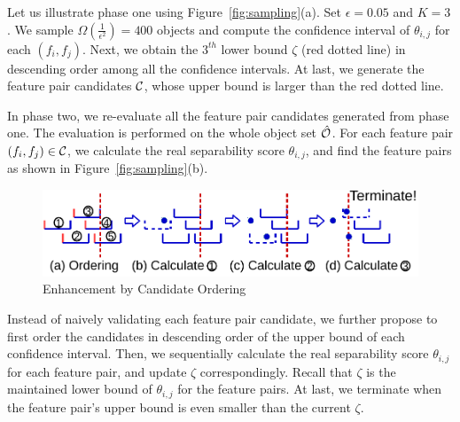 \begin{example}
Let us illustrate phase one using Figure~\ref{fig:sampling}(a). Set $\epsilon = 0.05$ and $K=3$. We sample $\Omega(\frac{1}{\epsilon^2})=400$ objects and compute the confidence interval of $\theta_{i,j}$ for each $(f_i,f_j)$. Next, we obtain the $3^{th}$ lower bound $\zeta$ (red dotted line) in descending order among all the confidence intervals. At last, we generate the feature pair candidates $\cc$, whose upper bound is larger than the red dotted line.
\end{example}

In phase two, we re-evaluate all the feature pair candidates generated from phase one. The evaluation is performed on the whole object set $\hat{\oo}$. For each feature pair $(f_i,f_j)\in \cc$, we calculate the real separability score $\theta_{i,j}$, and find the \topk feature pairs as shown in Figure~\ref{fig:sampling}(b). 
\begin{figure}[h]
  \centering
  \vspace{-5mm}
  \includegraphics[width=\linewidth]{fig/candidate_ordering.pdf}
  \vspace{-6mm}
\caption{Enhancement by Candidate Ordering}
\vspace{-5mm}
\label{fig:candidate_ordering}
\end{figure} 

  Instead of naively validating each feature pair candidate, we further propose to first order the candidates in descending order of the upper bound of each confidence interval. Then, we sequentially calculate the real separability score $\theta_{i,j}$ for each feature pair, and update $\zeta$ correspondingly. Recall that $\zeta$ is the maintained lower bound of $\theta_{i,j}$ for the \topk feature pairs. At last, we terminate when the feature pair's upper bound is even smaller than the current $\zeta$.


